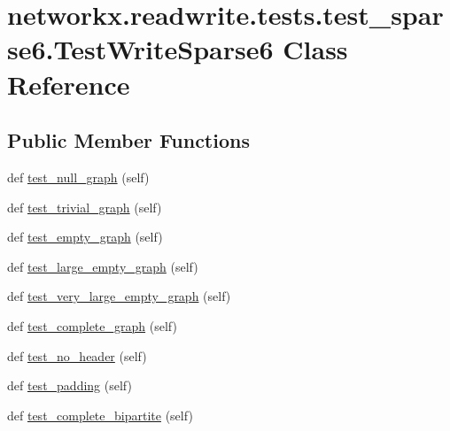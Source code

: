 \hypertarget{classnetworkx_1_1readwrite_1_1tests_1_1test__sparse6_1_1TestWriteSparse6}{}\section{networkx.\+readwrite.\+tests.\+test\+\_\+sparse6.\+Test\+Write\+Sparse6 Class Reference}
\label{classnetworkx_1_1readwrite_1_1tests_1_1test__sparse6_1_1TestWriteSparse6}
\subsection*{Public Member Functions}
\begin{DoxyCompactItemize}
\item 
def \hyperlink{classnetworkx_1_1readwrite_1_1tests_1_1test__sparse6_1_1TestWriteSparse6_a3c21887126ab4ee270ddd320e9676619}{test\+\_\+null\+\_\+graph} (self)
\item 
def \hyperlink{classnetworkx_1_1readwrite_1_1tests_1_1test__sparse6_1_1TestWriteSparse6_a48b6505254b88c74ccf9cea5420086d1}{test\+\_\+trivial\+\_\+graph} (self)
\item 
def \hyperlink{classnetworkx_1_1readwrite_1_1tests_1_1test__sparse6_1_1TestWriteSparse6_a320510b9647cf86ec54a472f42177910}{test\+\_\+empty\+\_\+graph} (self)
\item 
def \hyperlink{classnetworkx_1_1readwrite_1_1tests_1_1test__sparse6_1_1TestWriteSparse6_a00c3ec0a1de2e2d0c45c2ddbddc01aa4}{test\+\_\+large\+\_\+empty\+\_\+graph} (self)
\item 
def \hyperlink{classnetworkx_1_1readwrite_1_1tests_1_1test__sparse6_1_1TestWriteSparse6_a75ea8f85903c561c456828c17fe06f2d}{test\+\_\+very\+\_\+large\+\_\+empty\+\_\+graph} (self)
\item 
def \hyperlink{classnetworkx_1_1readwrite_1_1tests_1_1test__sparse6_1_1TestWriteSparse6_a83c0fcfe1fab4e8fdea6e9f940ce2ff0}{test\+\_\+complete\+\_\+graph} (self)
\item 
def \hyperlink{classnetworkx_1_1readwrite_1_1tests_1_1test__sparse6_1_1TestWriteSparse6_ae6d7e00df03081e46854a7a789910f03}{test\+\_\+no\+\_\+header} (self)
\item 
def \hyperlink{classnetworkx_1_1readwrite_1_1tests_1_1test__sparse6_1_1TestWriteSparse6_a2075a797d52f64e9cfa6f63a0b36d90d}{test\+\_\+padding} (self)
\item 
def \hyperlink{classnetworkx_1_1readwrite_1_1tests_1_1test__sparse6_1_1TestWriteSparse6_ae89995879e096dc39394b770cecb0384}{test\+\_\+complete\+\_\+bipartite} (self)

\end{DoxyCompactItemize}
